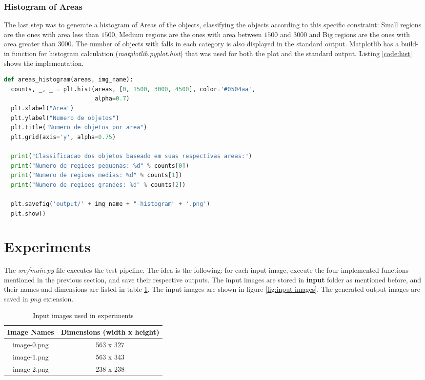 \documentclass[]{IEEEtran}
\begin{document}
\subsubsection{Histogram of Areas}
The last step was to generate a histogram of Areas of the objects, classifying the objects according to this specific constraint: Small regions are the ones with area less than $1500$, Medium regions are the ones with area between $1500$ and $3000$ and Big regions are the ones with area greater than $3000$. The number of objects with falls in each category is also displayed in the standard output. Matplotlib has a build-in function for histogram calculation (\textit{matplotlib.pyplot.hist}) that was used for both the plot and the standard output. Listing \ref{code:hist} shows the implementation.

\begin{lstlisting}[language=Python, caption={Histogram of Areas Implementation}, label={code:hist}]
def areas_histogram(areas, img_name):
  counts, _, _ = plt.hist(areas, [0, 1500, 3000, 4500], color='#0504aa',
                          alpha=0.7)
  plt.xlabel("Area")
  plt.ylabel("Numero de objetos")
  plt.title("Numero de objetos por area")
  plt.grid(axis='y', alpha=0.75)

  print("Classificacao dos objetos baseado em suas respectivas areas:")
  print("Numero de regioes pequenas: %d" % counts[0])
  print("Numero de regioes medias: %d" % counts[1])
  print("Numero de regioes grandes: %d" % counts[2])

  plt.savefig('output/' + img_name + "-histogram" + '.png')
  plt.show()
\end{lstlisting}

\section{Experiments}
The \textit{src/main.py} file executes the test pipeline. The idea is the following: for each input image, execute the four implemented functions mentioned in the previous section, and save their respective outputs. The input images are stored in \textbf{input} folder as mentioned before, and their names and dimensions are listed in table \ref{table:input}. The input images are shown in figure \ref{fig:input-images}. The generated output images are saved in $png$ extension.

\begin{table}[h!]
\centering
\begin{center}
\begin{tabular}{ |c|c| } 
 \hline
 Image Names & Dimensions (width x height) \\
 \hline
  image-0.png &  563 x 327\\ 
 \hline
  image-1.png & 563 x 343\\
 \hline
  image-2.png &  238 x 238\\ 
 \hline
\end{tabular}
\caption{Input images used in experiments}
\label{table:input}
\end{center}
\end{table}
\end{document}
